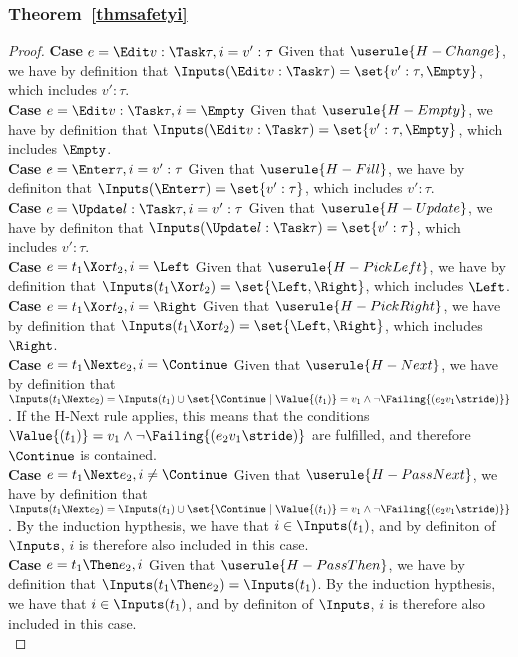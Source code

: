 \subsubsection{Theorem~\ref{thmsafetyi}}
\begin{proof}

  \noindent\textbf{Case} $e=\Edit v:\Task\tau, i= v':\tau$ Given that $\userule{H-Change}$, we have by definition that $\Inputs(\Edit v:\Task\tau) = \set{v':\tau,\Empty}$, which includes $v':\tau$.\\
  \noindent\textbf{Case} $e=\Edit v:\Task\tau, i= \Empty$ Given that $\userule{H-Empty}$, we have by definition that $\Inputs(\Edit v:\Task\tau) = \set{v':\tau,\Empty}$, which includes $\Empty$.\\
  \noindent\textbf{Case} $e=\Enter \tau, i= v':\tau$ Given that $\userule{H-Fill}$, we have by definiton that $\Inputs(\Enter \tau) = \set{v':\tau }$, which includes $v':\tau$.\\
  \noindent\textbf{Case} $e=\Update l:\Task\tau, i= v':\tau$ Given that $\userule{H-Update}$, we have by definiton that $\Inputs(\Update l:\Task\tau)= \set{v':\tau }$, which includes $v':\tau$.\\
  \noindent\textbf{Case} $e=t_1\Xor t_2 , i= \Left$ Given that $\userule{H-PickLeft}$, we have by definition that $\Inputs(t_1\Xor t_2) = \set{ \Left,\Right}$, which includes $\Left$.\\
  \noindent\textbf{Case} $e=t_1\Xor t_2 , i= \Right$ Given that $\userule{H-PickRight}$, we have by definition that $\Inputs(t_1\Xor t_2) = \set{ \Left,\Right}$, which includes $\Right$.\\
  \noindent\textbf{Case} $e=t_1\Next e_2 , i= \Continue $ Given that $\userule{H-Next}$, we have by definition that $\Inputs(t_1\Next e_2) = \Inputs(t_1) \cup \set{\Continue\mid \Value{(t_1)} = v_1 \wedge \neg\Failing{(e_2 v_1\stride)}}$. If the H-Next rule applies, this means that the conditions $\Value{(t_1)} = v_1 \wedge \neg\Failing{(e_2 v_1\stride)}$ are fulfilled, and therefore $\Continue$ is contained. \\
  \noindent\textbf{Case} $e=t_1\Next e_2 , i\neq\Continue$ Given that $\userule{H-PassNext}$, we have by definition that $\Inputs(t_1\Next e_2) = \Inputs(t_1) \cup \set{\Continue\mid \Value{(t_1)} = v_1 \wedge \neg\Failing{(e_2 v_1\stride)}}$. By the induction hypthesis, we have that $i\in \Inputs(t_1)$, and by definiton of $\Inputs$, $i$ is therefore also included in this case.\\
  \noindent\textbf{Case} $e=t_1\Then e_2 , i$ Given that $\userule{H-PassThen}$, we have by definition that $\Inputs(t_1\Then e_2)= \Inputs(t_1)$. By the induction hypthesis, we have that $i\in \Inputs(t_1)$, and by definiton of $\Inputs$, $i$ is therefore also included in this case.\\

\end{proof}
